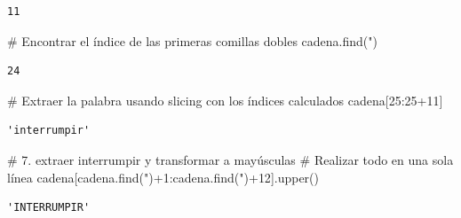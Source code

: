 \documentclass[
  spanish,
  letterpaper,
]{scrbook}
\newenvironment{Shaded}{\begin{snugshade}}{\end{snugshade}}
\newcommand{\CommentTok}[1]{\textcolor[rgb]{0.37,0.37,0.37}{#1}}
\newcommand{\DecValTok}[1]{\textcolor[rgb]{0.68,0.00,0.00}{#1}}
\newcommand{\NormalTok}[1]{\textcolor[rgb]{0.00,0.23,0.31}{#1}}
\newcommand{\OperatorTok}[1]{\textcolor[rgb]{0.37,0.37,0.37}{#1}}
\newcommand{\StringTok}[1]{\textcolor[rgb]{0.13,0.47,0.30}{#1}}
\theoremstyle{definition}
\theoremstyle{remark}
\begin{document}
\begin{verbatim}
11
\end{verbatim}

\begin{Shaded}
\begin{Highlighting}[]
\CommentTok{\# Encontrar el índice de las primeras comillas dobles}
\NormalTok{cadena.find(}\StringTok{\textquotesingle{}"\textquotesingle{}}\NormalTok{)}
\end{Highlighting}
\end{Shaded}

\begin{verbatim}
24
\end{verbatim}

\begin{Shaded}
\begin{Highlighting}[]
\CommentTok{\# Extraer la palabra usando slicing con los índices calculados}
\NormalTok{cadena[}\DecValTok{25}\NormalTok{:}\DecValTok{25}\OperatorTok{+}\DecValTok{11}\NormalTok{]}
\end{Highlighting}
\end{Shaded}

\begin{verbatim}
'interrumpir'
\end{verbatim}

\begin{Shaded}
\begin{Highlighting}[]
\CommentTok{\# 7. extraer \textquotesingle{}interrumpir\textquotesingle{} y transformar a mayúsculas}
\CommentTok{\# Realizar todo en una sola línea}
\NormalTok{cadena[cadena.find(}\StringTok{\textquotesingle{}"\textquotesingle{}}\NormalTok{)}\OperatorTok{+}\DecValTok{1}\NormalTok{:cadena.find(}\StringTok{\textquotesingle{}"\textquotesingle{}}\NormalTok{)}\OperatorTok{+}\DecValTok{12}\NormalTok{].upper()}
\end{Highlighting}
\end{Shaded}

\begin{verbatim}
'INTERRUMPIR'
\end{verbatim}
\end{document}
